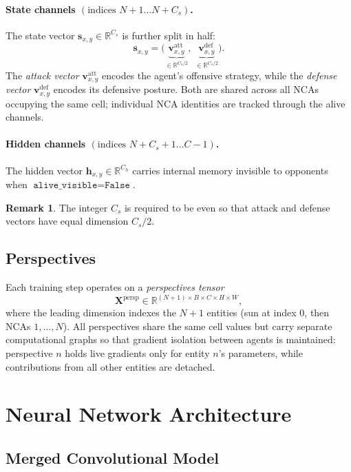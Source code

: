 \documentclass[11pt,a4paper]{article}
\newcommand{\R}{\mathbb{R}}
\newcommand{\vatt}{\mathbf{v}^{\mathrm{att}}}
\newcommand{\vdef}{\mathbf{v}^{\mathrm{def}}}
\theoremstyle{definition}
\newtheorem{remark}{Remark}[section]
\begin{document}
\paragraph{State channels $(\text{indices }N+1\ldots N+C_s)$.}
The state vector $\mathbf{s}_{x,y} \in \R^{C_s}$ is further split in half:
\[
    \mathbf{s}_{x,y} = \bigl(\underbrace{\vatt_{x,y}}_{\in\R^{C_s/2}},\; \underbrace{\vdef_{x,y}}_{\in\R^{C_s/2}}\bigr).
\]
The \emph{attack vector} $\vatt_{x,y}$ encodes the agent's offensive strategy, while the \emph{defense vector} $\vdef_{x,y}$ encodes its defensive posture. Both are shared across all NCAs occupying the same cell; individual NCA identities are tracked through the alive channels.

\paragraph{Hidden channels $(\text{indices }N+C_s+1\ldots C-1)$.}
The hidden vector $\mathbf{h}_{x,y} \in \R^{C_h}$ carries internal memory invisible to opponents when $\texttt{alive\_visible}=\texttt{False}$.

\begin{remark}
    The integer $C_s$ is required to be even so that attack and defense vectors have equal dimension $C_s/2$.
\end{remark}

\subsection{Perspectives}

Each training step operates on a \emph{perspectives tensor}
\[
    \mathbf{X}^{\mathrm{persp}} \in \R^{(N+1) \times B \times C \times H \times W},
\]
where the leading dimension indexes the $N+1$ entities (sun at index 0, then NCAs $1,\ldots,N$). All perspectives share the same cell values but carry separate computational graphs so that gradient isolation between agents is maintained: perspective $n$ holds live gradients only for entity $n$'s parameters, while contributions from all other entities are detached.

\section{Neural Network Architecture}

\subsection{Merged Convolutional Model}
\end{document}
